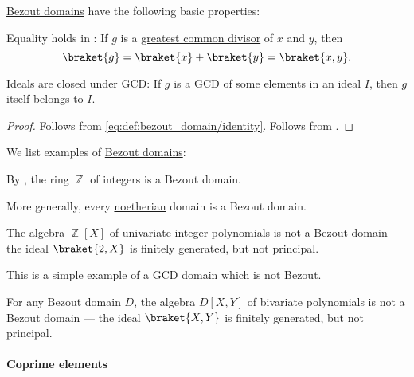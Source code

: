 \begin{proposition}\label{thm:def:bezout_domain}
  \hyperref[def:bezout_domain]{Bezout domains} have the following basic properties:
  \begin{thmenum}
     Equality holds in : If \( g \) is a \hyperref[def:gcd]{greatest common divisor} of \( x \) and \( y \), then
    \begin{equation*}
      \braket{ g } = \braket{ x } + \braket{ y } = \braket{ x, y }.
    \end{equation*}

     Ideals are closed under GCD: If \( g \) is a GCD of some elements in an ideal \( I \), then \( g \) itself belongs to \( I \).
  \end{thmenum}
\end{proposition}
\begin{proof}
   Follows from \eqref{eq:def:bezout_domain/identity}.
   Follows from .
\end{proof}

\begin{example}\label{ex:def:bezout_domain}
  We list examples of \hyperref[def:bezout_domain]{Bezout domains}:
  \begin{thmenum}
     By , the ring \( \BbbZ \) of integers is a Bezout domain.

     More generally, every \hyperref[def:noetherian_semiring]{noetherian} domain is a Bezout domain.

     The algebra \( \BbbZ[X] \) of univariate integer polynomials is not a Bezout domain --- the ideal \( \braket{ 2, X } \) is finitely generated, but not principal.

    This is a simple example of a GCD domain which is not Bezout.

     For any Bezout domain \( D \), the algebra \( D[X, Y] \) of bivariate polynomials is not a Bezout domain --- the ideal \( \braket{ X, Y } \) is finitely generated, but not principal.
  \end{thmenum}
\end{example}

\paragraph{Coprime elements}

